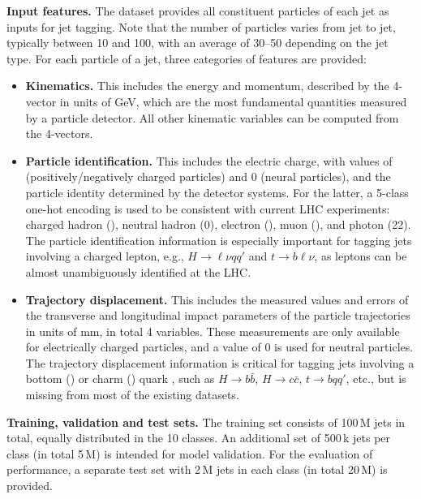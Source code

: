 \documentclass[nohyperref]{article}
\theoremstyle{plain}
\theoremstyle{definition}
\theoremstyle{remark}
\newcommand{\hbb}{\ensuremath{H\to b \bar{b}}\xspace}
\newcommand{\hcc}{\ensuremath{H\to c \bar{c}}\xspace}
\newcommand{\hlvqq}{\ensuremath{H\to \ell \nu q q'}\xspace}
\newcommand{\tbqq}{\ensuremath{t\to b q q'}\xspace}
\newcommand{\tblv}{\ensuremath{t\to b \ell \nu}\xspace}
\begin{document}
\textbf{Input features.} The dataset provides all constituent particles of each jet as inputs for jet tagging. Note that the number of particles varies from jet to jet, typically between 10 and 100, with an average of 30--50 depending on the jet type. For each particle of a jet, three categories of features are provided:
\begin{itemize}
    \vspace{-.2cm}
    \item \textbf{Kinematics.} This includes the energy and momentum, described by the 4-vector  in units of GeV, which are the most fundamental quantities measured by a particle detector. All other kinematic variables can be computed from the 4-vectors.
    \vspace{-.2cm}
    \item \textbf{Particle identification.} This includes the electric charge, with values of  (positively/negatively charged particles) and 0 (neural particles), and the particle identity determined by the detector systems. For the latter, a 5-class one-hot encoding is used to be consistent with current LHC experiments: charged hadron (), neutral hadron (0), electron (), muon (), and photon (22). The particle identification information is especially important for tagging jets involving a charged lepton, e.g., \hlvqq and \tblv, as leptons can be almost unambiguously identified at the LHC.
    \vspace{-.2cm}
    \item \textbf{Trajectory displacement.} This includes the measured values and errors of the transverse and longitudinal impact parameters of the particle trajectories in units of mm, in total 4 variables. These measurements are only available for electrically charged particles, and a value of 0 is used for neutral particles. The trajectory displacement information is critical for tagging jets involving a bottom () or charm () quark \cite{CMS:2020poo}, such as \hbb, \hcc, \tbqq, etc., but is missing from most of the existing datasets. 
    \vspace{-.2cm}
\end{itemize}

\textbf{Training, validation and test sets.} The training set consists of 100\,M jets in total, equally distributed in the 10 classes. An additional set of 500\,k jets per class (in total 5\,M) is intended for model validation. For the evaluation of performance, a separate test set with 2\,M jets in each class (in total 20\,M) is provided. 
\end{document}
